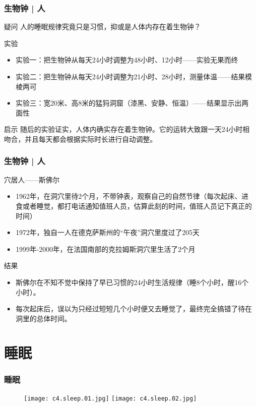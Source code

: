 \begin{frame}
  \frametitle{生物钟 | 人}
  \begin{block}{疑问}
    人的睡眠规律究竟只是习惯，抑或是人体内存在着生物钟？
  \end{block}
  \pause
  \begin{block}{实验}
    \begin{itemize}
      \item 实验一：把生物钟从每天24小时调整为48小时、12小时——实验无果而终
      \item 实验二：把生物钟从每天24小时调整为21小时、28小时，测量体温——结果模棱两可
      \item 实验三：宽20米、高8米的猛犸洞窟（漆黑、安静、恒温）——结果显示出两面性
    \end{itemize}
  \end{block}
  \pause
  \begin{block}{启示}
随后的实验证实，人体内确实存在着生物钟。它的运转大致跟一天24小时相吻合，并且每天都会根据实际时长进行自动调整。
  \end{block}
\end{frame}

\begin{frame}
  \frametitle{生物钟 | 人}
  \begin{block}{穴居人——斯佛尔}
    \begin{itemize}
      \item 1962年，在洞穴里待2个月，不带钟表，观察自己的自然节律（每次起床、进食或者睡觉，都打电话通知值班人员，估算此刻的时间，值班人员记下真正的时间）
      \item 1972年，独自一人在德克萨斯州的“午夜”洞穴里度过了205天
      \item 1999年-2000年，在法国南部的克拉姆斯洞穴里生活了2个月
    \end{itemize}
  \end{block}
  \pause
  \begin{block}{结果}
    \begin{itemize}
      \item 斯佛尔在不知不觉中保持了早已习惯的24小时生活规律（睡8个小时，醒16个小时）。
      \item 每次起床后，误以为只经过短短几个小时便又去睡觉了，最终完全搞错了待在洞里的总体时间。
    \end{itemize}
  \end{block}
\end{frame}

\section{睡眠}
\begin{frame}
  \frametitle{睡眠}
  \begin{figure}
    \centering
    \texttt{[image: c4.sleep.01.jpg]}
    \texttt{[image: c4.sleep.02.jpg]}
  \end{figure}
\end{frame}

